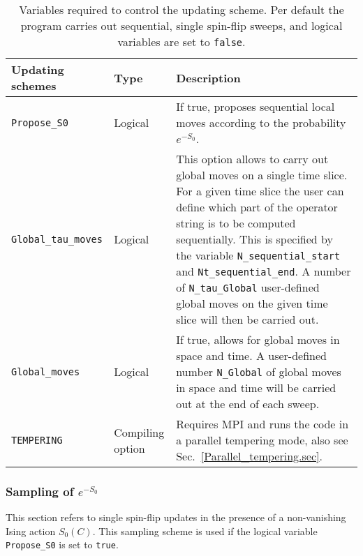 \begin{table}[h]
	\begin{tabular}{@{} l p{} p{} @{}}
		\toprule
		Updating schemes             &  Type            &  Description \\
		\midrule
		\texttt{Propose\_S0}         &  Logical         &  If true, proposes sequential local moves according to the probability $e^{-S_0}$. \\
		\texttt{Global\_tau\_moves}  &  Logical         &  This option allows to carry out  global moves on a single time slice.
		For a given time slice the user can define which part of the operator string is to be computed sequentially. This is specified by the  variable  \texttt{N\_sequential\_start} and \texttt{Nt\_sequential\_end}. A number of   \texttt{N\_tau\_Global} user-defined global moves on the given time slice  will then be carried out.   \\
		\texttt{Global\_moves}      &  Logical          &   If true, allows for global moves in space and time.   A user-defined number \texttt{N\_Global} of global moves in space and time  will be carried out at the end of each sweep. \\
		\texttt{TEMPERING}          &  Compiling option &    Requires MPI and  runs the code in a parallel tempering mode, also see Sec.~\ref{Parallel_tempering.sec}. \\
		\bottomrule
	\end{tabular}
	\caption{Variables required to control the updating scheme. Per default the program carries out sequential, single spin-flip sweeps, and logical variables are set to \texttt{false}.}
	\label{table:Updating_schemes}
\end{table}
% 



% 
\subsubsection{Sampling of $e^{-S_0}$}
% 
This section refers to single spin-flip updates in the presence of a non-vanishing Ising action $S_0(C)$. This sampling scheme is used if the logical variable \texttt{Propose\_S0} is set to \texttt{true}.

